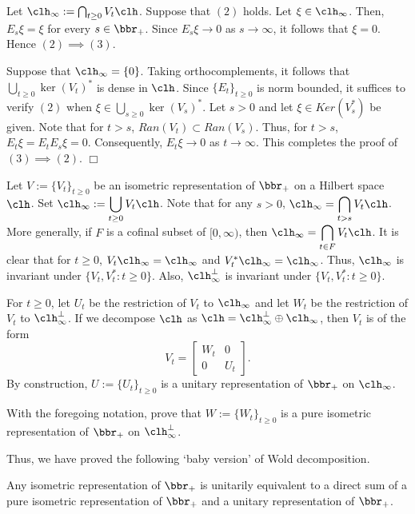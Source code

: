 Let $\clh_{\infty}:=\bigcap_{t \geq 0}V_t\clh$. Suppose that $(2)$ holds. Let $\xi \in \clh_{\infty}$. Then, $E_{s}\xi=\xi$ for every $s \in \bbr_{+}$. Since $E_{s}\xi \to 0$ as $s \to \infty$, it follows that $\xi=0$. 
Hence $(2) \implies (3)$. 

 Suppose that $\clh_{\infty}=\{0\}$. Taking orthocomplements, it follows that $\bigcup_{t \geq 0}\ker(V_t)^{*}$ is dense in $\clh$. Since $\{E_t\}_{t \geq 0}$ is norm bounded, it suffices to verify $(2)$ when $\xi \in \bigcup_{s \geq 0}\ker(V_s)^{*}$. 
 Let $s>0$ and let $\xi \in Ker(V_s^*)$ be given. Note that for $t>s$, $Ran(V_t) \subset Ran(V_s)$. Thus, for $t>s$, $E_t\xi=E_tE_s\xi=0$. Consequently, $E_t\xi \to 0$ as $t \to \infty$. This completes the proof of $(3) \implies (2)$. 
 \hfill $\Box$
 
 
 Let $V:=\{V_t\}_{t \geq 0}$ be an isometric representation of $\bbr_{+}$ on a Hilbert space $\clh$. Set $\clh_{\infty}:=\displaystyle \bigcup_{t \geq 0}V_t\clh$. Note that for any $s>0$, $\displaystyle \clh_{\infty}=\bigcap_{t >s}V_t\clh$. More generally, if $F$ is a cofinal subset of $[0,\infty)$, then $\clh_{\infty}=\displaystyle \bigcap_{t \in F}V_t\clh$. It is clear that for $t \geq 0$, $V_t\clh_{\infty}=\clh_{\infty}$ and $V_{t}^{*}\clh_\infty=\clh_\infty$. Thus, $\clh_{\infty}$ is invariant under $\{V_t,V_{t}^{*}: t \geq 0\}$. Also, $\clh_{\infty}^{\perp}$ is invariant under $\{V_t,V_{t}^{*}:t \geq 0\}$. 
 
 
 For $t \geq 0$, let $U_t$ be the restriction of $V_t$ to $\clh_\infty$ and let $W_t$ be the restriction of $V_t$ to $\clh_{\infty}^{\perp}$. If we decompose $\clh$ as $\clh=\clh_{\infty}^{\perp}\oplus \clh_{\infty}$, then $V_t$ is of the form 
\[V_t= \begin{bmatrix}
           W_t & 0 \\
           0 & U_t
           \end{bmatrix}.\] By construction, $U:=\{U_t\}_{t \geq 0}$ is a unitary representation of $\bbr_{+}$ on $\clh_{\infty}$. 
\begin{xrcs}
With the foregoing notation, prove that  $W:=\{W_t\}_{t \geq 0}$ is a pure isometric representation of $\bbr_{+}$ on $\clh_{\infty}^{\perp}$. 
 \end{xrcs} 
 
 Thus, we have proved the following `baby version' of Wold decomposition.
\begin{ppsn}
\label{Baby Wold}
Any isometric representation of $\bbr_{+}$ is unitarily equivalent to a direct sum of a pure isometric representation  of $\bbr_{+}$ and a unitary representation of $\bbr_{+}$. 
\end{ppsn}


